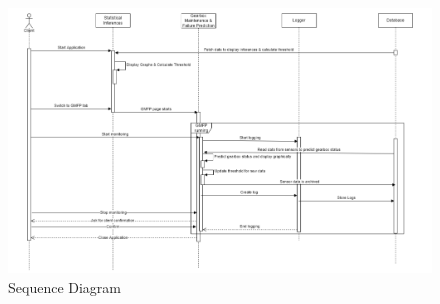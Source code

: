 
\label{sec:seq-dia}
\begin{figure}
	\centering
	\includegraphics[width=1.2\linewidth]{images/sequence-diagram.png}
	\caption{Sequence Diagram}
\end{figure} 